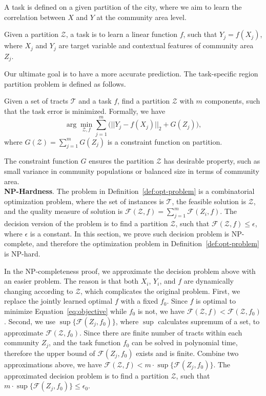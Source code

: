 A task is defined on a given partition of the city, where we aim to learn the correlation between $X$ and $Y$ at the community area level.
\begin{definition}[Task]
Given a partition $\mathcal{Z}$, a task is to learn a linear function $f$, such that $Y_j = f(X_j)$, 
where $X_j$ and $Y_j$ are target variable and contextual features of community area $Z_j$.
\end{definition}


Our ultimate goal is to have a more accurate prediction. The task-specific region partition problem is defined as follows.
\begin{definition}
\label{def:opt-problem}
Given a set of tracts $\mathcal{T}$ and a task $f$, find a partition $\mathcal{Z}$ with $m$ components, such that the task error is minimized. Formally, we have
\begin{equation}
\label{eq:objective}
\arg\min_{\mathcal{Z}, f} \sum_{j=1}^m \Big(||Y_j - f(X_j)||_2 + G(Z_j)\Big),
\end{equation}
where $G(\mathcal{Z}) = \sum_{j=1}^m G(Z_j)$ is a constraint function on partition.
\end{definition}

The constraint function $G$ ensures the partition $\mathcal{Z}$ has desirable property, such as small variance in community populations or balanced size in terms of community area. \\


\noindent\textbf{NP-Hardness}. The problem in Definition~\ref{def:opt-problem} is a combinatorial optimization problem, where the set of instances is $\mathcal{T}$, the feasible solution is $\mathcal{Z}$, and the quality measure of solution is $\mathcal{F}(\mathcal{Z}, f) = \sum_{j=1}^m \mathcal{F}(Z_i, f)$. The decision version of the problem is to find a partition $\mathcal{Z}$, such that $\mathcal{F}(\mathcal{Z}, f) \leq \epsilon$, where $\epsilon$ is a constant. In this section, we prove such decision problem is NP-complete, and therefore the optimization problem in Definition~\ref{def:opt-problem} is NP-hard.

In the NP-completeness proof, we approximate the decision problem above with an easier problem. The reason is that both $X_i$, $Y_i$, and $f$ are dynamically changing according to $\mathcal{Z}$, which complicates the original problem. First, we replace the jointly learned optimal $f$ with a fixed $f_0$. Since $f$ is optimal to minimize Equation~\ref{eq:objective} while $f_0$ is not, we have $\mathcal{F}(\mathcal{Z}, f) < \mathcal{F}(\mathcal{Z}, f_0)$. Second, we use $\sup \{\mathcal{F}(Z_j, f_0) \}$, where $\sup$ calculates supremum of a set, to approximate $\mathcal{F}(\mathcal{Z}, f_0)$. Since there are finite number of tracts within each community $Z_j$, and the task function $f_0$ can be solved in polynomial time, therefore the upper bound of $\mathcal{F}(Z_j, f_0)$ exists and is finite. Combine two approximations above, we have $\mathcal{F}(\mathcal{Z}, f) < m \cdot \sup \{ \mathcal{F}(Z_j, f_0)\}$. The approximated decision problem is to find a partition $\mathcal{Z}$, such that $m \cdot \sup \{\mathcal{F}(Z_j, f_0) \} \leq \epsilon_0$.

